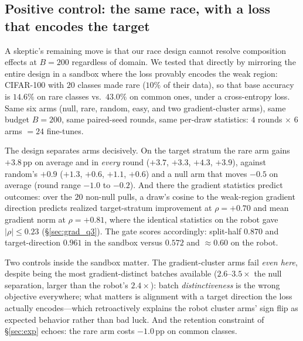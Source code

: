 \subsection{Positive control: the same race, with a loss that encodes the target}
\label{sec:grad_q4}
A skeptic's remaining move is that our race design cannot resolve composition
effects at $B{=}200$ regardless of domain. We tested that directly by mirroring
the entire design in a sandbox where the loss provably encodes the weak region:
CIFAR-100 with $20$ classes made rare ($10\%$ of their data), so that base
accuracy is $14.6\%$ on rare classes vs.\ $43.0\%$ on common ones, under a
cross-entropy loss. Same six arms (null, rare, random, easy, and two
gradient-cluster arms), same budget $B{=}200$, same paired-seed rounds, same
per-draw statistics: $4$ rounds $\times$ $6$ arms $=24$ fine-tunes.

The design separates arms decisively. On the target stratum the rare arm gains
$+3.8$\,pp on average and in \emph{every} round ($+3.7$, $+3.3$, $+4.3$,
$+3.9$), against random's $+0.9$ ($+1.3$, $+0.6$, $+1.1$, $+0.6$) and a
null arm that moves $-0.5$ on average (round range $-1.0$ to $-0.2$). And there
the gradient statistics predict outcomes: over the $20$ non-null pulls, a
draw's cosine to the weak-region gradient direction predicts realized
target-stratum improvement at $\rho{=}{+}0.70$ and mean gradient norm at
$\rho{=}{+}0.81$, where the identical statistics on the robot gave
$|\rho|\leq0.23$ (\S\ref{sec:grad_q3}). The gate scores accordingly: split-half
$0.870$ and target-direction $0.961$ in the sandbox versus $0.572$ and
$\approx$$0.60$ on the robot.

Two controls inside the sandbox matter. The gradient-cluster arms fail
\emph{even here}, despite being the most gradient-distinct batches available
($2.6$--$3.5\times$ the null separation, larger than the robot's $2.4\times$):
batch \emph{distinctiveness} is the wrong objective everywhere; what matters is
alignment with a target direction the loss actually encodes---which
retroactively explains the robot cluster arms' sign flip as expected behavior
rather than bad luck. And the retention constraint of \S\ref{sec:exp} echoes:
the rare arm costs $-1.0$\,pp on common classes.

